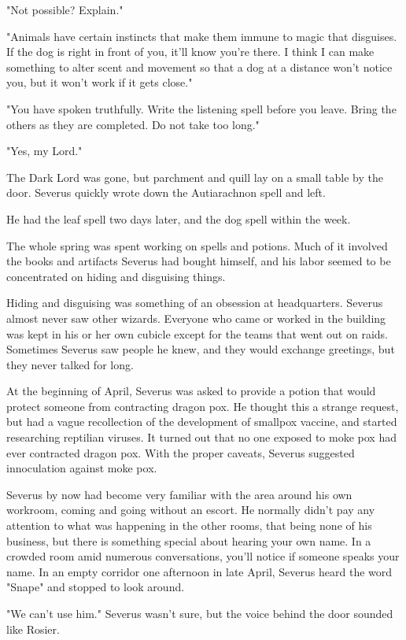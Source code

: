 \documentclass[a4paper,11pt]{article}
\begin{document}
"Not possible? Explain."

"Animals have certain instincts that make them immune to magic that disguises. If the dog is right in front of you, it'll know you're there. I think I can make something to alter scent and movement so that a dog at a distance won't notice you, but it won't work if it gets close."

"You have spoken truthfully. Write the listening spell before you leave. Bring the others as they are completed. Do not take too long."

"Yes, my Lord."

The Dark Lord was gone, but parchment and quill lay on a small table by the door. Severus quickly wrote down the Autiarachnon spell and left.

He had the leaf spell two days later, and the dog spell within the week.

The whole spring was spent working on spells and potions. Much of it involved the books and artifacts Severus had bought himself, and his labor seemed to be concentrated on hiding and disguising things.

Hiding and disguising was something of an obsession at headquarters. Severus almost never saw other wizards. Everyone who came or worked in the building was kept in his or her own cubicle except for the teams that went out on raids. Sometimes Severus saw people he knew, and they would exchange greetings, but they never talked for long.

At the beginning of April, Severus was asked to provide a potion that would protect someone from contracting dragon pox. He thought this a strange request, but had a vague recollection of the development of smallpox vaccine, and started researching reptilian viruses. It turned out that no one exposed to moke pox had ever contracted dragon pox. With the proper caveats, Severus suggested innoculation against moke pox.

Severus by now had become very familiar with the area around his own workroom, coming and going without an escort. He normally didn't pay any attention to what was happening in the other rooms, that being none of his business, but there is something special about hearing your own name. In a crowded room amid numerous conversations, you'll notice if someone speaks your name. In an empty corridor one afternoon in late April, Severus heard the word "Snape" and stopped to look around.

"We can't use him." Severus wasn't sure, but the voice behind the door sounded like Rosier.
\end{document}
